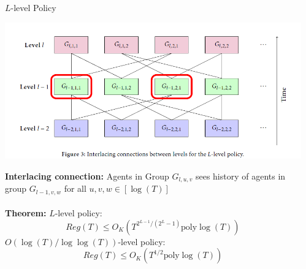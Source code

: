 \documentclass[final]{beamer}
\begin{document}
\begin{frame}[t]
\begin{columns}[t]
\begin{column}{.44\textwidth}
\begin{block}{$L$-level Policy}
\begin{center}
\includegraphics[width=0.99\linewidth]{ll.png} 
\end{center}
\textbf{Interlacing connection:} Agents in Group $G_{l,u,v}$ sees history of agents in group $G_{l-1,v,w}$ for all $u,v,w \in [\log(T)]$\\
~\\
\textbf{Theorem:}
$L$-level policy:
\[
Reg(T) \leq O_K (T^{2^{L-1} / (2^L-1)} \text{poly}\log(T))
\]
$O(\log(T)/\log\log(T))$-level policy:
\[
Reg(T) \leq O_K(T^{1/2} \text{poly} \log(T))
\]
\end{block}

\end{column} %

\begin{column}{.01\textwidth}\end{column} %

\end{columns} %

\end{frame} %
\end{document}
